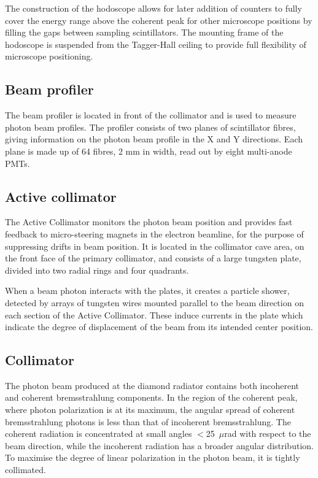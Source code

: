 The construction of the hodoscope allows for later addition of counters to fully cover the energy range above the coherent peak for other microscope positions by filling the gaps between sampling scintillators. The mounting frame of the hodoscope is suspended from the Tagger-Hall ceiling to provide full flexibility of microscope positioning.

\subsection{Beam profiler}
The beam profiler is located in front of the collimator and is used to measure photon beam profiles.
The profiler consists of two planes of scintillator fibres, giving information on the photon beam profile in the X and Y directions.
Each plane is made up of 64 fibres, 2 mm in width, read out by eight multi-anode PMTs.

\subsection{Active collimator \label{sec:coll}}
The Active Collimator monitors the photon beam position and provides fast feedback to micro-steering magnets in the electron beamline, for the purpose of suppressing drifts in beam position.
It is located in the collimator cave area, on the front face of the primary collimator, and consists of a large tungsten plate, divided into two radial rings and four quadrants.

When a beam photon interacts with the plates, it creates a particle shower, detected by arrays of tungsten wires mounted parallel to the beam direction on each section of the Active Collimator.
These induce currents in the plate which indicate the degree of displacement of the beam from its intended center position.

\subsection{Collimator}
The photon beam produced at the diamond radiator contains both incoherent and coherent bremsstrahlung components.
In the region of the coherent peak, where photon polarization is at its maximum, the angular spread of coherent bremsstrahlung photons is less than that of incoherent bremsstrahlung.
The coherent radiation is concentrated at small angles $<$25~$\mu$rad with respect to the beam direction, while the incoherent radiation has a broader angular distribution.
To maximise the degree of linear polarization in the photon beam, it is tightly collimated.

